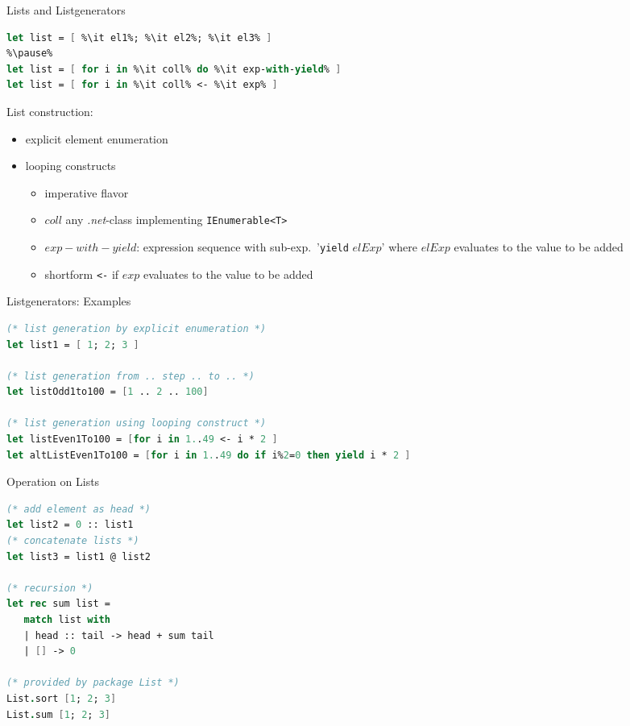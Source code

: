 \documentclass{beamer}
\begin{document}
\begin{frame}[fragile]{Lists and Listgenerators}
\begin{overlayarea}{\textwidth}{0.3\textheight}
\begin{lstlisting}[language=FSharp, escapechar=\%]
let list = [ %\it el1%; %\it el2%; %\it el3% ]   
%\pause%
let list = [ for i in %\it coll% do %\it exp-with-yield% ]   
let list = [ for i in %\it coll% <- %\it exp% ]   
\end{lstlisting}
\end{overlayarea}
List construction:
\begin{itemize}
\item explicit element enumeration
\item looping constructs
  \begin{itemize}
    \item imperative flavor
    \item $coll$ any \textsl{.net}-class implementing \texttt{IEnumerable<T>} 
    \item $exp-with-yield$: expression sequence with sub-exp.\ '\lstinline!yield! $elExp$' where $elExp$ evaluates to the value to be added
    \item shortform \lstinline!<-! if $exp$ evaluates to the value to be added 
 \end{itemize}
\end{itemize}
\end{frame}

\begin{frame}[fragile]{Listgenerators: Examples}
\begin{lstlisting}[language=FSharp]
 (* list generation by explicit enumeration *)
let list1 = [ 1; 2; 3 ] 

(* list generation from .. step .. to .. *)
let listOdd1to100 = [1 .. 2 .. 100]

(* list generation using looping construct *)
let listEven1To100 = [for i in 1..49 <- i * 2 ]  
let altListEven1To100 = [for i in 1..49 do if i%2=0 then yield i * 2 ]  

\end{lstlisting}
\end{frame}

\begin{frame}[fragile]{Operation on Lists}
\begin{lstlisting}[language=FSharp]
 (* add element as head *)
let list2 = 0 :: list1
(* concatenate lists *)
let list3 = list1 @ list2

(* recursion *)
let rec sum list =
   match list with
   | head :: tail -> head + sum tail
   | [] -> 0

(* provided by package List *)
List.sort [1; 2; 3]
List.sum [1; 2; 3]

\end{lstlisting}

\end{frame}
\end{document}
